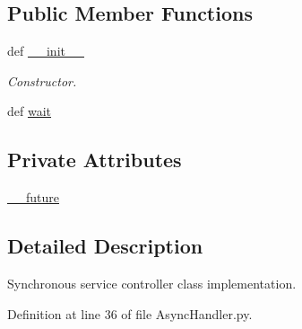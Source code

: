 \subsection*{Public Member Functions}
\begin{DoxyCompactItemize}
\item 
def \hyperlink{classRappCloud_1_1ServiceController_1_1AsyncHandler_1_1AsyncHandler_a89df1d81da604c031845623899f15756}{\-\_\-\-\_\-init\-\_\-\-\_\-}
\begin{DoxyCompactList}\small\item\em Constructor. \end{DoxyCompactList}\item 
def \hyperlink{classRappCloud_1_1ServiceController_1_1AsyncHandler_1_1AsyncHandler_a1162c421a8963c3a2c5f5657c58c1553}{wait}
\end{DoxyCompactItemize}
\subsection*{Private Attributes}
\begin{DoxyCompactItemize}
\item 
\hyperlink{classRappCloud_1_1ServiceController_1_1AsyncHandler_1_1AsyncHandler_ac08a48bf10a7a98a98d85d65dd2cf1a9}{\-\_\-\-\_\-future}
\end{DoxyCompactItemize}


\subsection{Detailed Description}
\begin{DoxyVerb}Synchronous service controller class implementation. \end{DoxyVerb}
 

Definition at line 36 of file Async\-Handler.\-py.




